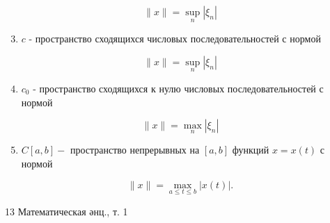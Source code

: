 \documentclass[10pt]{article}
\begin{document}
\[

\|x\|=\sup _{n}\left|\xi_{n}\right|

\]



\begin{enumerate}

  \setcounter{enumi}{2}

  \item $c$ - пространство сходящихся числовых последовательностей с нормой

\end{enumerate}



\[

\|x\|=\sup _{n}\left|\xi_{n}\right|

\]



\begin{enumerate}

  \setcounter{enumi}{3}

  \item $c_{0}$ - пространство сходящихся к нулю числовых последовательностей с нормой

\end{enumerate}



\[

\|x\|=\max _{n}\left|\xi_{n}\right|

\]



\begin{enumerate}

  \setcounter{enumi}{4}

  \item $C[a, b]-$ пространство непрерывных на $[a, b]$ функций $x=x(t)$ с нормой

\end{enumerate}



\[

\|x\|=\max _{a \leqslant t \leqslant b}|x(t)| .

\]



13 Математическая әнц., т. 1
\end{document}
